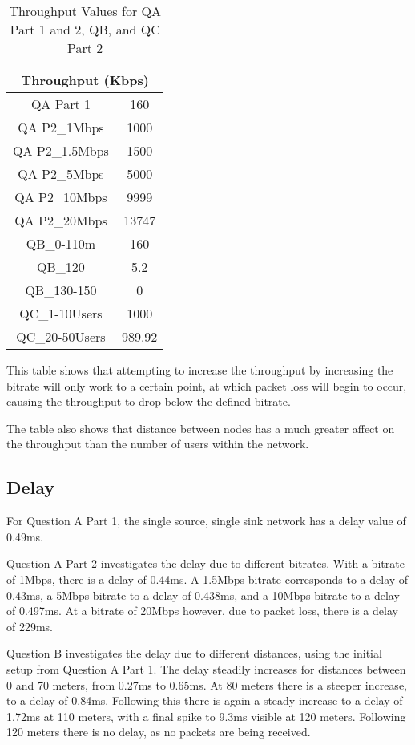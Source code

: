 \begin{table}[H]
	\centering
	\caption{Throughput Values for QA Part 1 and 2, QB, and QC Part 2}
	\label{tab:P2TP}
	\begin{tabular}{|c|c|}
		\hline
		\multicolumn{2}{|c|}{Throughput (Kbps)} \\
		\hline
		QA Part 1 & 160 \\
		QA P2_{1Mbps} & 1000\\
		QA P2_{1.5Mbps} & 1500\\
		QA P2_{5Mbps} & 5000\\
		QA P2_{10Mbps} & 9999\\
		QA P2_{20Mbps} & 13747\\
		QB_{0-110m} & 160\\
		QB_{120} & 5.2\\
		QB_{130-150} & 0\\
		QC_{1-10Users} & 1000 \\
		QC_{20-50Users} & 989.92 \\
		\hline
	\end{tabular}
\end{table}

This table shows that attempting to increase the throughput by increasing the
bitrate will only work to a certain point, at which packet loss will begin to
occur, causing the throughput to drop below the defined bitrate.

\par The table also shows that distance between nodes has a much greater affect
on the throughput than the number of users within the network.

\subsection{Delay}

For Question A Part 1, the single source, single sink network has a delay
value of 0.49ms.

\par Question A Part 2 investigates the delay due to different bitrates.
With a bitrate of 1Mbps, there is a delay of 0.44ms. A 1.5Mbps bitrate
corresponds to a delay of 0.43ms, a 5Mbps bitrate to a delay of 0.438ms, and
a 10Mbps bitrate to a delay of 0.497ms. At a bitrate of 20Mbps
however, due to packet loss, there is a delay of 229ms.

\par Question B investigates the delay due to different distances, using
the initial setup from Question A Part 1. The delay steadily increases for
distances between 0 and 70 meters, from 0.27ms to 0.65ms. At 80 meters there
is a steeper increase, to a delay of 0.84ms. Following this there is again a
steady increase to a delay of 1.72ms at 110 meters, with a final spike to 9.3ms
visible at 120 meters. Following 120 meters there is no delay, as no packets are
being received.

